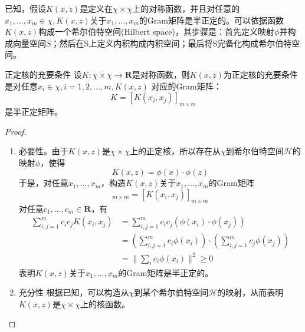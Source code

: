 已知，假设$K(x,z)$是定义在$\chi \times \chi$上的对称函数，并且对任意的$x_1,\dots,x_m\in \chi,K(x,z)$关于$x_1,\dots,x_m$的Gram矩阵是半正定的。可以依据函数$K(x,z)$构成一个希尔伯特空间(Hilbert space)，其步骤是：首先定义映射$\phi$并构成向量空间$S$；然后在S上定义内积构成内积空间；最后将S完备化构成希尔伯特空间。
\begin{theorem}{正定核的充要条件}{}
	设$K:\chi \times \chi\to \boldsymbol{R}$是对称函数，则$K(x,z)$为正定核的充要条件是对任意$x_i\in \chi,i=1,2,\dots,m,K(x,z)$ 对应的Gram矩阵：
	\begin{equation}
		K=[K(x_i,x_j)]_{m\times m}
	\end{equation}
	是半正定矩阵。
\end{theorem}
\begin{proof}
	\begin{enumerate}
	\item 必要性。由于$K(x,z)$是$\chi\times\chi$上的正定核，所以存在从$\chi$到希尔伯特空间$\mathcal{H}$的映射$\phi$，使得
	\begin{equation}
		K(x,z)=\phi(x)\cdot\phi(z)
	\end{equation}
	于是，对任意$x_1,\dots,x_m$，构造$K(x,z)$关于$x_1,\dots,x_m$的Gram矩阵
	\begin{equation}
		[K_{ij}]_{m\times m}=[K(x_i,x_j)]_{m\times m}
	\end{equation}
	对任意$c_1,\dots,c_m\in \boldsymbol{R}$，有
	\begin{equation}
		\begin{aligned}
		\sum_{i,j=1}^{m}c_ic_jK(x_i,x_j)&=\sum_{i,j=1}^{m}c_ic_j(\phi(x_i)\cdot\phi(x_j))\\
		&=\left(\sum_{i,j=1}^{m}c_i\phi(x_i) \right)\cdot \left(\sum_{i,j=1}^{m}c_j\phi(x_j) \right)\\
		&=\Bigg\| \sum_ic_i\phi(x_i)\Bigg\|^2\geqslant 0
		\end{aligned}
	\end{equation}
	表明$K(x,z)$关于$x_1,\dots,x_m$的Gram矩阵是半正定的。
	\item 充分性
	根据已知，可以构造从$\chi$到某个希尔伯特空间$\mathcal{H}$的映射，从而表明$K(x,z)$是$\chi\times \chi$上的核函数。
	\end{enumerate}
\end{proof}
